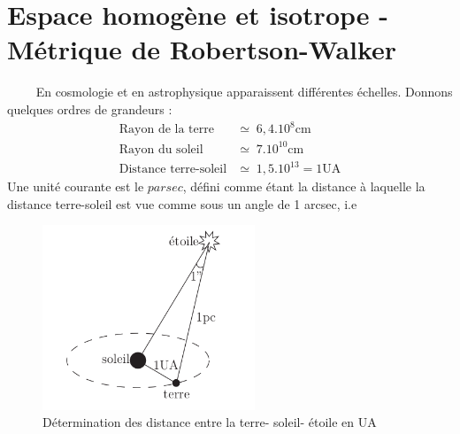 \documentclass[a4paper,12pt]{report}
\theoremstyle{plain}
\theoremstyle{plain}
\begin{document}
 
 \section{Espace homog\`ene et isotrope - M\'etrique de Robertson-Walker} 
 $\qquad$ 	 En cosmologie et en astrophysique apparaissent diff\'erentes \'echelles. Donnons quelques ordres de grandeurs :
 \begin{align}
 \text{Rayon de la terre} &\simeq \;6,4.10^8 \text{cm} \\
 \text{Rayon du soleil} & \simeq \;7.10^{10} \text{cm} \\
 \text{Distance terre-soleil} &\simeq \; 1,5.10^{13}  =1\text{UA} 
 \end{align}
 Une unit\'e courante est le $parsec$, d\'efini comme \'etant la distance \`a laquelle la distance terre-soleil est vue comme sous un angle de 1 arcsec, i.e 
 
%  

\begin{figure}[h]
\begin{center}
\includegraphics[width=15pc]{t1.png}
\caption{ Détermination des distance entre la terre- soleil- étoile en UA}
\end{center}
\end{figure}
 
\end{document}
